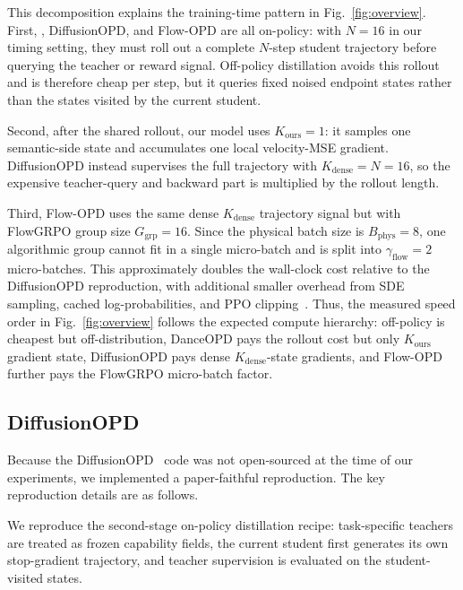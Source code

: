 This decomposition explains the training-time pattern in Fig.~\ref{fig:overview}. First, \name{}, DiffusionOPD, and Flow-OPD are all on-policy: with $N{=}16$ in our timing setting, they must roll out a complete $N$-step student trajectory before querying the teacher or reward signal. Off-policy distillation avoids this rollout and is therefore cheap per step, but it queries fixed noised endpoint states rather than the states visited by the current student. 

Second, after the shared rollout, our model uses $K_{\mathrm{ours}}{=}1$: it samples one semantic-side state and accumulates one local velocity-MSE gradient. DiffusionOPD instead supervises the full trajectory with $K_{\mathrm{dense}}{=}N{=}16$, so the expensive teacher-query and backward part is multiplied by the rollout length. 

Third, Flow-OPD uses the same dense $K_{\mathrm{dense}}$ trajectory signal but with FlowGRPO group size $G_{\mathrm{grp}}{=}16$. Since the physical batch size is $B_{\mathrm{phys}}{=}8$, one algorithmic group cannot fit in a single micro-batch and is split into $\gamma_{\mathrm{flow}}{=}2$ micro-batches. This approximately doubles the wall-clock cost relative to the DiffusionOPD reproduction, with additional smaller overhead from SDE sampling, cached log-probabilities, and PPO clipping~\cite{schulman2017proximal,liu2026flow}. Thus, the measured speed order in Fig.~\ref{fig:overview} follows the expected compute hierarchy: off-policy is cheapest but off-distribution, DanceOPD pays the rollout cost but only $K_{\mathrm{ours}}$ gradient state, DiffusionOPD pays dense $K_{\mathrm{dense}}$-state gradients, and Flow-OPD further pays the FlowGRPO micro-batch factor.


\vspace{0.2cm}


\subsection{DiffusionOPD}
\label{app:diffusionopd-reproduction}

Because the DiffusionOPD~\cite{li2026diffusionopd} code was not open-sourced at the time of our experiments, we implemented a paper-faithful reproduction. The key reproduction details are as follows.

We reproduce the second-stage on-policy distillation recipe: task-specific teachers are treated as frozen capability fields, the current student first generates its own stop-gradient trajectory, and teacher supervision is evaluated on the student-visited states. 

